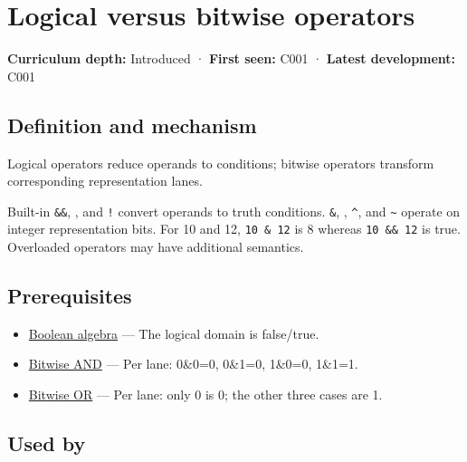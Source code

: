\hypertarget{appendix-fe6b457d68d8}{}\label{referencestart:appendix-fe6b457d68d8}
\section{Logical versus bitwise operators}\label{appendix-fe6b457d68d8-logical-versus-bitwise-operators}

\textbf{Curriculum depth:} Introduced · \textbf{First seen:} C001 · \textbf{Latest development:} C001

\begin{allmightroledefinition}

\subsection{Definition and mechanism}\label{appendix-fe6b457d68d8-definition-and-mechanism}

Logical operators reduce operands to conditions; bitwise operators transform corresponding representation lanes.

\end{allmightroledefinition}

Built-in \texttt{\&\&}, \texttt{\textbar{}\textbar{}}, and \texttt{!} convert operands to truth conditions. \texttt{\&}, \texttt{\textbar{}}, \texttt{\^{}}, and \texttt{\textasciitilde{}} operate on integer representation bits. For 10 and 12, \texttt{10\ \&\ 12} is 8 whereas \texttt{10\ \&\&\ 12} is true. Overloaded operators may have additional semantics.

\subsection{Prerequisites}\label{appendix-fe6b457d68d8-prerequisites}

\begin{itemize}
\tightlist
\item
  \hyperref[appendix-24475e1596a8]{Boolean algebra} --- The logical domain is false/true.
\item
  \hyperref[appendix-68b52453737c]{Bitwise AND} --- Per lane: 0\&0=0, 0\&1=0, 1\&0=0, 1\&1=1.
\item
  \hyperref[appendix-a427ce8ce8a6]{Bitwise OR} --- Per lane: only 0 is 0; the other three cases are 1.
\end{itemize}

\subsection{Used by}\label{appendix-fe6b457d68d8-used-by}

